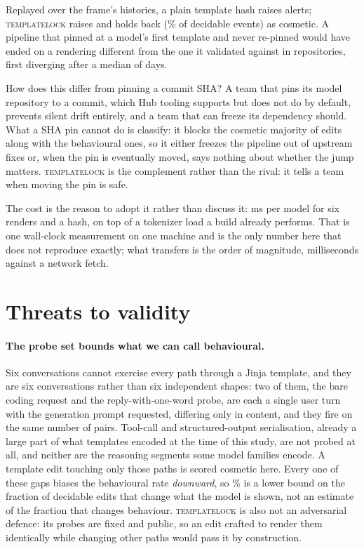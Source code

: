 Replayed over the frame's histories, a plain template hash raises \NaiveAlerts{} alerts;
\textsc{templatelock} raises \RenderAlerts{} and holds back \SuppressedAlerts{}
(\PctSuppressed\% of decidable events) as cosmetic. A pipeline that pinned at a model's first
template and never re-pinned would have ended on a rendering different from the one it validated
against in \NStranded{} repositories, first diverging after a median of \MedianDaysStranded{} days.

How does this differ from pinning a commit SHA? A team that pins its model repository to a commit,
which Hub tooling supports but does not do by default, prevents silent drift entirely, and a team
that can freeze its dependency should. What a SHA pin cannot do is classify: it blocks the cosmetic
majority of edits along with the behavioural ones, so it either freezes the pipeline out of
upstream fixes or, when the pin is eventually moved, says nothing about whether the jump matters.
\textsc{templatelock} is the complement rather than the rival: it tells a team when moving the pin
is safe.

The cost is the reason to adopt it rather than discuss it: \CostComputeMs{} ms per model for six
renders and a hash, on top of a tokenizer load a build already performs. That is one wall-clock
measurement on one machine and is the only number here that does not reproduce exactly; what
transfers is the order of magnitude, milliseconds against a network fetch.

\section{Threats to validity}

\paragraph{The probe set bounds what we can call behavioural.} Six conversations cannot exercise
every path through a Jinja template, and they are six conversations rather than six independent
shapes: two of them, the bare coding request and the reply-with-one-word probe, are each a single
user turn with the generation prompt requested, differing only in
content, and they fire on the same number of pairs. Tool-call and structured-output serialisation,
already a large part of what templates encoded at the time of this study, are not probed at all,
and neither are the reasoning segments some model families encode. A template edit touching only those
paths is scored cosmetic here. Every one of these gaps biases the behavioural rate \emph{downward},
so \PctEventsBeh\% is a lower bound on the fraction of decidable edits that change what the model
is shown, not an estimate of the fraction that changes behaviour. \textsc{templatelock} is also not an
adversarial defence: its probes are fixed and public, so an edit crafted to render them
identically while changing other paths would pass it by construction.


